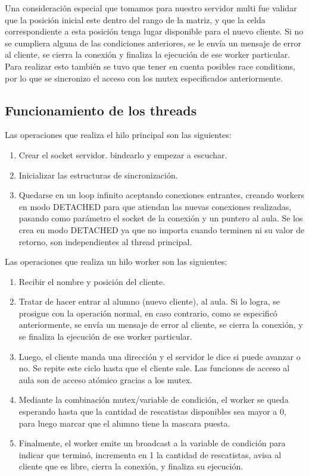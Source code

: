 Una consideraci\'on especial que tomamos para nuestro servidor multi fue validar que la posici\'on inicial este dentro del rango de la matriz, y que la celda correspondiente a esta posici\'on tenga lugar disponible para el nuevo cliente. Si no se cumpliera alguna de las condiciones anteriores, se le env\'ia un mensaje de error al cliente, se cierra la conexi\'on y finaliza la ejecuci\'on de ese worker particular. Para realizar esto tambi\'en se tuvo que tener en cuenta posibles race conditions, por lo que se sincronizo el acceso con los mutex especificados anteriormente.

\subsection{Funcionamiento de los threads}

Las operaciones que realiza el hilo principal son las siguientes:

\begin{enumerate}
\item Crear el socket servidor. bindearlo y empezar a escuchar.
\item Inicializar las estructuras de sincronizaci\'on.
\item Quedarse en un loop infinito aceptando conexiones entrantes, creando workers en modo DETACHED para que atiendan las nuevas conexiones realizadas, pasando como par\'ametro el socket de la conexi\'on y un puntero al aula. Se los crea en modo DETACHED ya que no importa cuando terminen ni su valor de retorno, son independientes al thread principal.
\end{enumerate}

Las operaciones que realiza un hilo worker son las siguientes:

\begin{enumerate}
\item Recibir el nombre y posici\'on del cliente.
\item Tratar de hacer entrar al alumno (nuevo cliente), al aula. Si lo logra, se prosigue con la operaci\'on normal, en caso contrario, como se especific\'o anteriormente, se env\'ia un mensaje de error al cliente, se cierra la conexi\'on, y se finaliza la ejecuci\'on de ese worker particular.
\item Luego, el cliente manda una direcci\'on y el servidor le dice si puede avanzar o no. Se repite este ciclo hasta que el cliente sale. Las funciones de acceso al aula son de acceso at\'omico gracias a los mutex.
\item Mediante la combinaci\'on mutex/variable de condici\'on, el worker se queda esperando hasta que la cantidad de rescatistas disponibles sea mayor a 0, para luego marcar que el alumno tiene la mascara puesta.
\item Finalmente, el worker emite un broadcast a la variable de condici\'on para indicar que termin\'o, incrementa en 1 la cantidad de rescatistas, avisa al cliente que es libre, cierra la conexi\'on, y finaliza su ejecuci\'on.
\end{enumerate}

